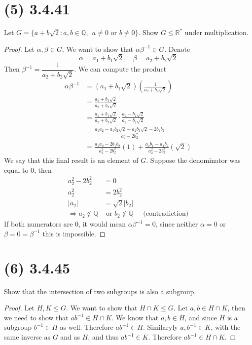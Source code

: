 \documentclass{article}
\begin{document}
\section*{(5) 3.4.41}
Let $G = \{ a + b \sqrt{2} : a,b \in \mathbb{Q}, \ \ a \neq 0 \text{ or } b \neq 0\}$.
Show $G \leq \mathbb{R}^*$ under multiplication.
\begin{proof}
    Let $\alpha, \beta \in G$.
    We want to show that $\alpha \beta^{-1} \in G$.
    Denote
    \[\alpha = a_1 + b_1 \sqrt{2}, \ \ \ \ \beta = a_2 + b_2 \sqrt{2}\]
    Then $\beta^{-1} = \dfrac{1}{a_2 + b_2\sqrt{2}}$.
    We can compute the product
    \begin{align*}
        \alpha \beta^{-1} & = (a_1 + b_1\sqrt{2})\left(\frac{1}{a_2 + b_2 \sqrt{2}}\right)\\
        & = \frac{a_1 + b_1 \sqrt{2}}{a_2 + b_2 \sqrt{2}} \\
        & = \frac{a_1 + b_1 \sqrt{2}}{a_2 + b_2 \sqrt{2}} \cdot \frac{a_2 - b_2 \sqrt{2}}{a_2 - b_2 \sqrt{2}} \\
        & = \frac{a_1a_2 - a_1b_2\sqrt{2} + a_2b_1\sqrt{2} - 2b_1b_2}{a_2^2-2b_2^2}\\
        & = \frac{a_1a_2 - 2b_1b_2}{a_2^2-2b_2^2}(1) + \frac{a_2b_1-a_1b_2}{a_2^2-2b_2^2}(\sqrt{2})
    \end{align*}
    We say that this final result is an element of $G$.
    Suppose the denominator was equal to 0, then 
    \begin{align*}
        a_2^2-2b_2^2 & = 0 \\
        a_2^2 & = 2b_2^2 \\
        |a_2| & = \sqrt{2}|b_2| \\
        \Longrightarrow a_2 \notin \mathbb{Q} & \text{ or } b_2 \notin \mathbb{Q} \ \ \ \ \ \text{    (contradiction)}
    \end{align*}
    If both numerators are 0, it would mean $\alpha \beta^{-1} = 0$, since neither $\alpha = 0$ or $\beta = 0 = \beta^{-1}$ this is impossible.
\end{proof}
\section*{(6) 3.4.45}
    Show that the intersection of two subgroups is also a subgroup.
    \begin{proof}
        Let $H, K \leq G$.
        We want to show that $H \cap K \leq G$.
        Let $a, b \in H \cap K$, then we need to show that $ab^{-1} \in H \cap K$.
        We know that $a,b \in H$, and since $H$ is a subgroup $b^{-1} \in H$ as well.
        Therefore $ab^{-1} \in H$.
        Similaryly $a,b^{-1} \in K$, with the same inverse as $G$ and as $H$, and thus $ab^{-1} \in K$.
        Therefore $ab^{-1} \in H \cap K$.
    \end{proof}
\end{document}
